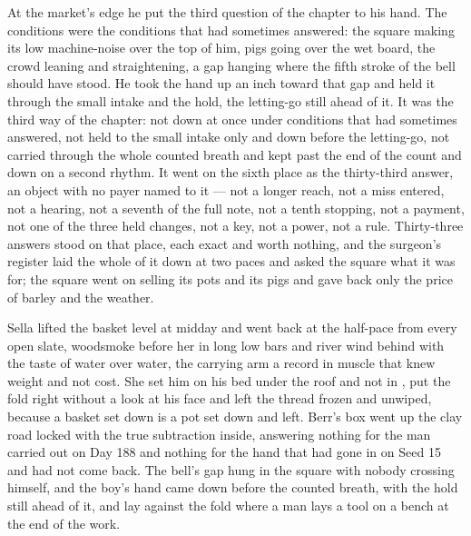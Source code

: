 At the market's edge he put the third question of the chapter to his hand. The conditions were the conditions that had sometimes answered: the square making its low machine-noise over the top of him, pigs going over the wet board, the crowd leaning and straightening, a gap hanging where the fifth stroke of the bell should have stood. He took the hand up an inch toward that gap and held it through the small intake and the hold, the letting-go still ahead of it. It was the third way of the chapter: not down at once under conditions that had sometimes answered, not held to the small intake only and down before the letting-go, not carried through the whole counted breath and kept past the end of the count and down on a second rhythm. It went on the sixth place as the thirty-third answer, an object with no payer named to it --- not a longer reach, not a miss entered, not a hearing, not a seventh of the full note, not a tenth stopping, not a payment, not one of the three held changes, not a key, not a power, not a rule. Thirty-three answers stood on that place, each exact and worth nothing, and the surgeon's register laid the whole of it down at two paces and asked the square what it was for; the square went on selling its pots and its pigs and gave back only the price of barley and the weather.

Sella lifted the basket level at midday and went back at the half-pace from every open slate, woodsmoke before her in long low bars and river wind behind with the taste of water over water, the carrying arm a record in muscle that knew weight and not cost. She set him on his bed under the roof and not in , put the fold right without a look at his face and left the thread frozen and unwiped, because a basket set down is a pot set down and left. Berr's box went up the clay road locked with the true subtraction inside, answering nothing for the man carried out on Day 188 and nothing for the hand that had gone in on Seed 15 and had not come back. The bell's gap hung in the square with nobody crossing himself, and the boy's hand came down before the counted breath, with the hold still ahead of it, and lay against the fold where a man lays a tool on a bench at the end of the work.
